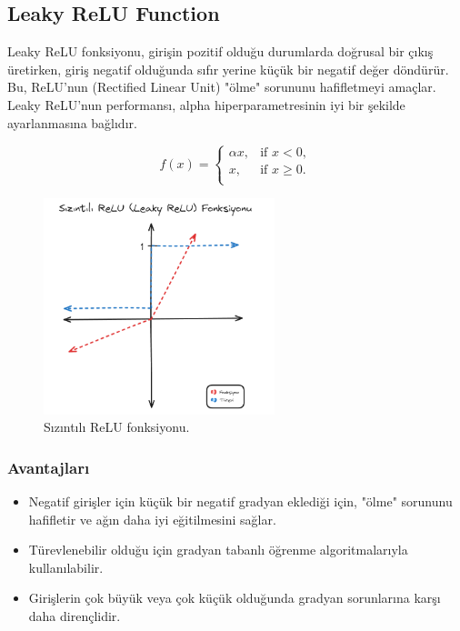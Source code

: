 \newpage

\subsection{Leaky ReLU Function}
Leaky ReLU fonksiyonu, girişin pozitif olduğu durumlarda doğrusal bir çıkış üretirken, giriş negatif olduğunda sıfır yerine küçük bir negatif değer döndürür. Bu, ReLU'nun (Rectified Linear Unit) "ölme" sorununu hafifletmeyi amaçlar. Leaky ReLU'nun performansı, alpha hiperparametresinin iyi bir şekilde ayarlanmasına bağlıdır.

\[f(x) = \begin{cases} 
\alpha x, & \text{if } x < 0, \\
x, & \text{if } x \geq 0. \\
\end{cases}
\]

\begin{figure}[h]
    \centering
    \includegraphics[width=0.6\textwidth]{images/leaky_relu_function.png}
    \caption{Sızıntılı ReLU fonksiyonu.}
    \label{fig:enter-label}
\end{figure}

\subsubsection{Avantajları}
\begin{itemize}
    \item Negatif girişler için küçük bir negatif gradyan eklediği için, "ölme" sorununu hafifletir ve ağın daha iyi eğitilmesini sağlar.
    \item Türevlenebilir olduğu için gradyan tabanlı öğrenme algoritmalarıyla kullanılabilir.
    \item Girişlerin çok büyük veya çok küçük olduğunda gradyan sorunlarına karşı daha dirençlidir.
\end{itemize}

